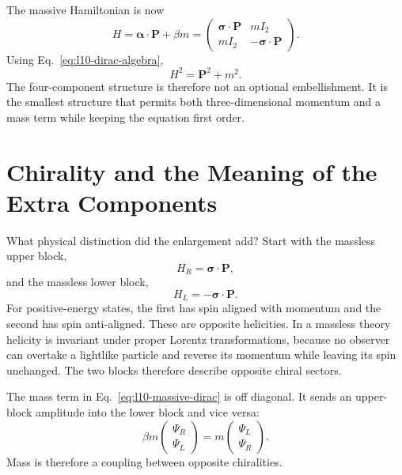 The massive Hamiltonian is now
\begin{equation}
H=\boldsymbol{\alpha}\cdot\mathbf P+\beta m
=
\begin{pmatrix}
\boldsymbol{\sigma}\cdot\mathbf P&mI_2\\
mI_2&-\boldsymbol{\sigma}\cdot\mathbf P
\end{pmatrix}.
\label{eq:l10-massive-dirac}
\end{equation}
Using Eq.~\eqref{eq:l10-dirac-algebra},
\begin{equation}
H^2=\mathbf P^2+m^2.
\end{equation}
The four-component structure is therefore not an optional embellishment. It is the smallest structure that permits both three-dimensional momentum and a mass term while keeping the equation first order.

\section{Chirality and the Meaning of the Extra Components}

What physical distinction did the enlargement add? Start with the massless upper block,
\begin{equation}
H_R=\boldsymbol{\sigma}\cdot\mathbf P,
\end{equation}
and the massless lower block,
\begin{equation}
H_L=-\boldsymbol{\sigma}\cdot\mathbf P.
\end{equation}
For positive-energy states, the first has spin aligned with momentum and the second has spin anti-aligned. These are opposite helicities. In a massless theory helicity is invariant under proper Lorentz transformations, because no observer can overtake a lightlike particle and reverse its momentum while leaving its spin unchanged. The two blocks therefore describe opposite chiral sectors.

\begin{classroomqa}
\end{classroomqa}

The mass term in Eq.~\eqref{eq:l10-massive-dirac} is off diagonal. It sends an upper-block amplitude into the lower block and vice versa:
\begin{equation}
\beta m
\begin{pmatrix}
\Psi_R\\
\Psi_L
\end{pmatrix}
=
m
\begin{pmatrix}
\Psi_L\\
\Psi_R
\end{pmatrix}.
\end{equation}
Mass is therefore a coupling between opposite chiralities.

